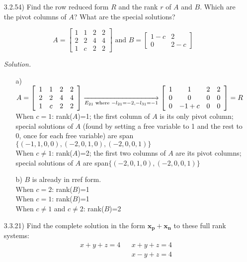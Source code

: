 \documentclass[12pt]{article}
\begin{document}
\begin{itemize}
\item[3.2.54)] Find the row reduced form $R$ and the rank $r$ of $A$ and $B$. Which are the pivot columns of $A$? What are the special solutions?

\[A=\left[\begin{array}{cccc}
1 & 1 & 2 & 2 \\
2 & 2 & 4 & 4  \\
1 & c & 2 & 2
\end{array}\right]
\text{  and  }
B=\left[\begin{array}{cc}
1-c &  2 \\
 0  & 2-c      
\end{array}\right]
\]

\textit{Solution.}
	\begin{itemize}
	\item[a)] $A=\left[\begin{array}{cccc}
			  1 & 1 & 2 & 2 \\
			  2 & 2 & 4 & 4  \\
			  1 & c & 2 & 2
			  \end{array}\right]
              \underset{E_{21} \text{ where } -l_{21}=-2, -l_{31}=-1}{\xrightarrow{\hspace{36mm}}}
              \left[\begin{array}{cccc}
			  1 & 1 & 2 & 2 \\
			  0 & 0 & 0 & 0  \\
			  0 & -1+c & 0 & 0
              \end{array}\right]=R$ \\
              When $c=1$: rank($A$)=1; the first column of $A$ is its only pivot column; 
              special solutions of $A$ (found by setting a free variable to 1 and the rest to 0, once for each
              free variable) are span$\{(-1,1,0,0),(-2,0,1,0),(-2,0,0,1)\}$\\
              When $c\neq 1$: rank($A$)=2; the first two columns of $A$ are its pivot columns; special solutions of $A$ 
              are span$\{(-2,0,1,0),(-2,0,0,1)\}$
    \item[b)] $B$ is already in rref form.\\
    		  When $c=2$: rank($B$)=1\\
              When $c=1$: rank($B$)=1\\
              When $c\neq 1$ and $c\neq 2$: rank($B$)=2
	\end{itemize}

\item[3.3.21)] Find the complete solution in the form $\mathbf{x_p+x_n}$ to these full rank systems:
\begin{align*}
&x+y+z=4 && x+y+z=4\\
& &&x-y+z=4
\end{align*}



\end{itemize}
\end{document}
